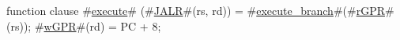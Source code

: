 function clause #\hyperref[zexecute]{execute}# (#\hyperref[zJALR]{JALR}#(rs, rd)) =
  {
    #\hyperref[zexecutezybranch]{execute\_branch}#(#\hyperref[zrGPR]{rGPR}#(rs));
    #\hyperref[zwGPR]{wGPR}#(rd)      = PC + 8;
  }
